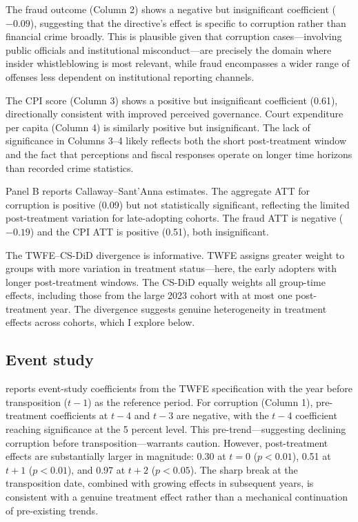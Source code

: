 \documentclass[12pt]{article}
\begin{document}
The fraud outcome (Column 2) shows a negative but insignificant coefficient ($-0.09$), suggesting that the directive's effect is specific to corruption rather than financial crime broadly. This is plausible given that corruption cases---involving public officials and institutional misconduct---are precisely the domain where insider whistleblowing is most relevant, while fraud encompasses a wider range of offenses less dependent on institutional reporting channels.

The CPI score (Column 3) shows a positive but insignificant coefficient (0.61), directionally consistent with improved perceived governance. Court expenditure per capita (Column 4) is similarly positive but insignificant. The lack of significance in Columns 3--4 likely reflects both the short post-treatment window and the fact that perceptions and fiscal responses operate on longer time horizons than recorded crime statistics.

Panel B reports Callaway--Sant'Anna estimates. The aggregate ATT for corruption is positive (0.09) but not statistically significant, reflecting the limited post-treatment variation for late-adopting cohorts. The fraud ATT is negative ($-0.19$) and the CPI ATT is positive (0.51), both insignificant.

The TWFE--CS-DiD divergence is informative. TWFE assigns greater weight to groups with more variation in treatment status---here, the early adopters with longer post-treatment windows. The CS-DiD equally weights all group-time effects, including those from the large 2023 cohort with at most one post-treatment year. The divergence suggests genuine heterogeneity in treatment effects across cohorts, which I explore below.

\subsection{Event study}



 reports event-study coefficients from the TWFE specification with the year before transposition ($t - 1$) as the reference period. For corruption (Column 1), pre-treatment coefficients at $t - 4$ and $t - 3$ are negative, with the $t - 4$ coefficient reaching significance at the 5 percent level. This pre-trend---suggesting declining corruption before transposition---warrants caution. However, post-treatment effects are substantially larger in magnitude: 0.30 at $t = 0$ ($p < 0.01$), 0.51 at $t + 1$ ($p < 0.01$), and 0.97 at $t + 2$ ($p < 0.05$). The sharp break at the transposition date, combined with growing effects in subsequent years, is consistent with a genuine treatment effect rather than a mechanical continuation of pre-existing trends.
\end{document}
